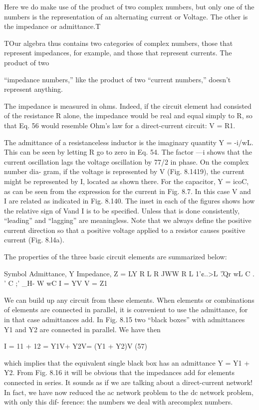 {Here we do make use of the product of two complex numbers, but
only one of the numbers is the representation of an alternating current
or Voltage. The other is the impedance or admittance.T

TOur algebra thus contains two categories of complex numbers, those that represent
impedances, for example, and those that represent currents. The product of two

``impedance numbers,'' like the product of two ``current numbers,'' doesn't represent
anything.

The impedance is measured in ohms. Indeed, if the circuit element
had consisted of the resistance R alone, the impedance would
be real and equal simply to R, so that Eq. 56 would resemble Ohm's
law for a direct-current circuit: V = R1.

The admittance of a resistanceless inductor is the imaginary
quantity Y = -i/wL. This can be seen by letting R go to zero in
Eq. 54. The factor ---i shows that the current oscillation lags the
voltage oscillation by 77/2 in phase. On the complex number dia-
gram, if the voltage is represented by V (Fig. 8.1419), the current
might be represented by I, located as shown there. For the capacitor,
Y = icoC, as can be seen from the expression for the current in
Fig. 8.7. In this case V and I are related as indicated in Fig. 8.140.
The inset in each of the figures shows how the relative sign of Vand I
is to be specified. Unless that is done consistently, ``leading'' and
``lagging'' are meaningless. Note that we always define the positive
current direction so that a positive voltage applied to a resistor causes
positive current (Fig. 8.l4a).

The properties of the three basic circuit elements are summarized
below:

Symbol Admittance, Y Impedance, Z = LY
R L R
JWW R
L  1'¢..>L
'\U.Qr wL
C .
' C ;'
_H- W wC
I = YV V = Z1

We can build up any circuit from these elements. When elements
or combinations of elements are connected in parallel, it is convenient
to use the admittance, for in that case admittances add. In Fig. 8.15
two ``black boxes'' with admittances Y1 and Y2 are connected in
parallel. We have then

\begin{equation}
\end{equation}
I = 11 + 12 = Y1V+ Y2V= (Y1 + Y2)V (57)

  

which implies that the equivalent single black box has an admittance
Y = Y1 + Y2. From Fig. 8.16 it will be obvious that the impedances
add for elements connected in series. It sounds as if we are talking
about a direct-current network! In fact, we have now reduced the
ac network problem to the dc network problem, with only this dif-
ference: the numbers we deal with arecomplex numbers.

}
